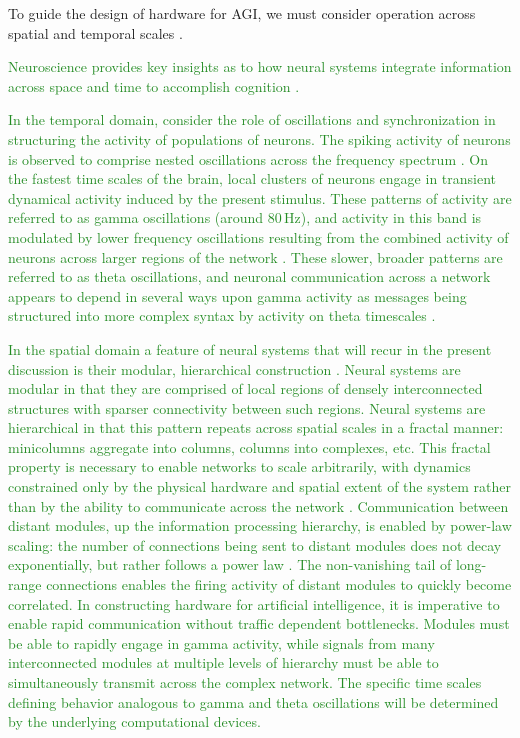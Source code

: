 \documentclass[twocolumn]{article}
\begin{document}
To guide the design of hardware for AGI, we must consider operation across spatial and temporal scales \cite{beba2016,khma2018}. \textcolor{ForestGreen}{Neuroscience provides key insights as to how neural systems integrate information across space and time to accomplish cognition \cite{bu2005,baga2011}. 

\textcolor{ForestGreen}{In the temporal domain, consider the role of oscillations and synchronization \cite{bu2005} in structuring the activity of populations of neurons. The spiking activity of neurons is observed to comprise nested oscillations across the frequency spectrum \cite{budr2004,bu2005}. On the fastest time scales of the brain, local clusters of neurons engage in transient dynamical activity induced by the present stimulus. These patterns of activity are referred to as gamma oscillations (around 80\,Hz), and activity in this band is modulated by lower frequency oscillations resulting from the combined activity of neurons across larger regions of the network \cite{ca2006}. These slower, broader patterns are referred to as theta oscillations, and neuronal communication across a network appears to depend in several ways upon gamma activity as messages being structured into more complex syntax by activity on theta timescales \cite{fr2015,bu2019}.}

\textcolor{ForestGreen}{In the spatial domain a feature of neural systems that will recur in the present discussion is their modular, hierarchical construction \cite{mela2010,beba2017,khma2018}. Neural systems are modular in that they are comprised of local regions of densely interconnected structures with sparser connectivity between such regions. Neural systems are hierarchical in that this pattern repeats across spatial scales in a fractal manner: minicolumns aggregate into columns, columns into complexes, etc. This fractal property is necessary to enable networks to scale arbitrarily, with dynamics constrained only by the physical hardware and spatial extent of the system rather than by the ability to communicate across the network \cite{plth2006}. Communication between distant modules, up the information processing hierarchy, is enabled by power-law scaling: the number of connections being sent to distant modules does not decay exponentially, but rather follows a power law \cite{babu2010,spte2016}. The non-vanishing tail of long-range connections enables the firing activity of distant modules to quickly become correlated. In constructing hardware for artificial intelligence, it is imperative to enable rapid communication without traffic dependent bottlenecks. Modules must be able to rapidly engage in gamma activity, while signals from many interconnected modules at multiple levels of hierarchy must be able to simultaneously transmit across the complex network. The specific time scales defining behavior analogous to gamma and theta oscillations will be determined by the underlying computational devices.}

}
\end{document}
